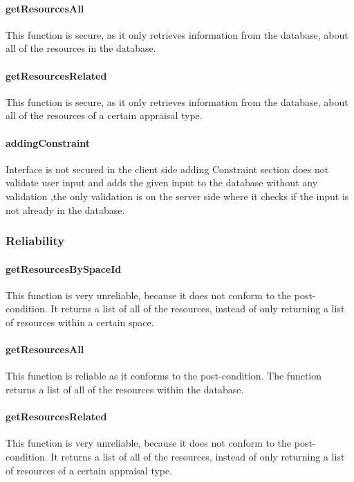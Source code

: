 \documentclass[a4paper]{article}
\begin{document}
\paragraph{getResourcesAll}
This function is secure, as it only retrieves information from the database, about all of the resources in the database.

\paragraph{getResourcesRelated}
This function is secure, as it only retrieves information from the database, about all of the resources of a certain appraisal type.

\paragraph{addingConstraint}
Interface is not secured in the client side adding Constraint section does not validate user input and adds the given input to the database without any validation ,the only validation is on the server side where it checks if the input is not already in the database.

\subsubsection {Reliability}

\paragraph{getResourcesBySpaceId}
This function is very unreliable, because it does not conform to the post-condition. It returns a list of all of the resources, instead of only returning a list of resources within a certain space.

\paragraph{getResourcesAll}
This function is reliable as it conforms to the post-condition. The function returns a list of all of the resources within the database.

\paragraph{getResourcesRelated}
This function is very unreliable, because it does not conform to the post-condition. It returns a list of all of the resources, instead of only returning a list of resources of a certain appraisal type.
\end{document}

